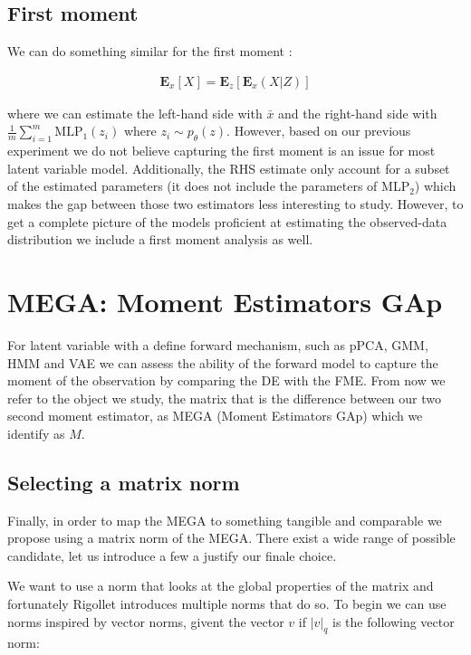 \documentclass{article}
\newcommand{\Ex}{\textbf{E}_x}
\newcommand{\Ez}{\textbf{E}_z}
\begin{document}
\subsection{First moment}

We can do something similar for the first moment :

\begin{align}
\Ex[X] = \Ez[\Ex(X|Z)] 
\label{1stm}
\end{align}

where we can estimate the left-hand side with $\bar{x}$ and the right-hand side with $\frac{1}{m} \sum_{i=1}^m \text{MLP}_1(z_i)$ where $z_i \sim p_\theta(z)$. However, based on our previous experiment we do not believe capturing the first moment is an issue for most latent variable model. Additionally, the RHS estimate only account for a subset of the estimated parameters (it does not include the parameters of MLP$_2$) which makes the gap between those two estimators less interesting to study. However, to get a complete picture of the models proficient at estimating the observed-data distribution we include a first moment analysis as well. 

 

\section{MEGA: Moment Estimators GAp} \label{mega}

For latent variable with a define forward mechanism, such as pPCA, GMM, HMM and VAE we can assess the ability of the forward model to capture the moment of the observation by comparing the DE with the FME. From now we refer to the object we study, the matrix that is the difference between our two second moment estimator, as MEGA (Moment Estimators GAp) which we identify as $M$. 

\subsection{Selecting a matrix norm}

Finally, in order to map the MEGA to something tangible and comparable we propose using a matrix norm of the MEGA. There exist a wide range of possible candidate, let us introduce a few a justify our finale choice. 

\bigskip

We want to use a norm that looks at the global properties of the matrix and fortunately Rigollet \cite{rigollet15} introduces multiple norms that do so. To begin we can use norms inspired by vector norms, givent the vector $v$ if $|v|_q$ is the following vector norm:
\end{document}

